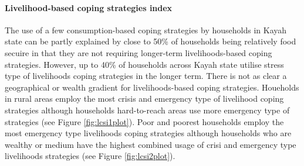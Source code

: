 \documentclass[12pt,a4paper]{article}
\let\oldparagraph\paragraph
\renewcommand{\paragraph}[1]{\oldparagraph{#1}\mbox{}}
\begin{document}
\hypertarget{lcsi-results}{%
\paragraph{Livelihood-based coping strategies index}\label{lcsi-results}}

The use of a few consumption-based coping strategies by households in Kayah state can be partly explained by close to 50\% of households being relatively food secuire in that they are not requiring longer-term livelihoods-based coping strategies. However, up to 40\% of households across Kayah state utilise stress type of livelihoods coping strategies in the longer term. There is not as clear a geographical or wealth gradient for livelihoods-based coping strategies. Houeholds in rural areas employ the most crisis and emergency type of livelihood coping strategies although households hard-to-reach areas use more emergency type of strategies (see Figure \ref{fig:lcsi1plot}). Poor and poorest households employ the most emergency type livelihoods coping strategies although households who are wealthy or medium have the highest combined usage of crisi and emergency type livelihoods strategies (see Figure \ref{fig:lcsi2plot}).
\end{document}
